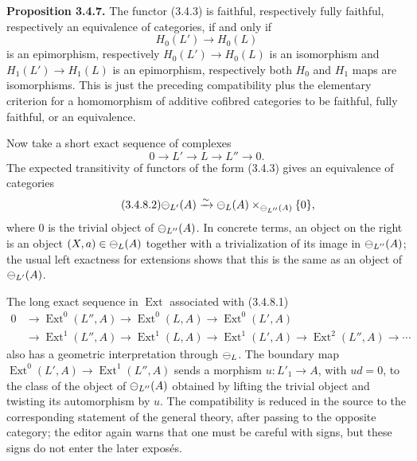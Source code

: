 \documentclass[11pt]{article}
\providecommand{\Ext}{\operatorname{Ext}}
\begin{document}
\textbf{Proposition 3.4.7.}  The functor (3.4.3) is faithful, respectively fully faithful, respectively an equivalence of categories, if and only if
\begin{equation}\tag{3.4.7.1}
  H_0(L')\longrightarrow H_0(L)
\end{equation}
is an epimorphism, respectively \(H_0(L')\to H_0(L)\) is an isomorphism and \(H_1(L')\to H_1(L)\) is an epimorphism, respectively both \(H_0\) and \(H_1\) maps are isomorphisms.  This is just the preceding compatibility plus the elementary criterion for a homomorphism of additive cofibred categories to be faithful, fully faithful, or an equivalence.

Now take a short exact sequence of complexes
\begin{equation}\tag{3.4.8.1}
  0\longrightarrow L'\longrightarrow L\longrightarrow L''\longrightarrow0.
\end{equation}
The expected transitivity of functors of the form (3.4.3) gives an equivalence of categories
\begin{equation}\tag{3.4.8.2}
  \mathcal\Psi_{L'}(A)\xrightarrow{\sim}\mathcal\Psi_L(A)\times_{\mathcal\Psi_{L''}(A)}\{0\},
\end{equation}
where \(0\) is the trivial object of \(\mathcal\Psi_{L''}(A)\).  In concrete terms, an object on the right is an object \((X,a)\in\mathcal\Psi_L(A)\) together with a trivialization of its image in \(\mathcal\Psi_{L''}(A)\); the usual left exactness for extensions shows that this is the same as an object of \(\mathcal\Psi_{L'}(A)\).

The long exact sequence in \(\Ext\) associated with (3.4.8.1)
\begin{equation}\tag{3.4.9.1}
\begin{aligned}
0&\to\Ext^0(L'',A)\to\Ext^0(L,A)\to\Ext^0(L',A)\\
 &\to\Ext^1(L'',A)\to\Ext^1(L,A)\to\Ext^1(L',A)\to\Ext^2(L'',A)\to\cdots
\end{aligned}
\end{equation}
also has a geometric interpretation through \(\mathcal\Psi_L\).  The boundary map \(\Ext^0(L',A)\to\Ext^1(L'',A)\) sends a morphism \(u:L'_1\to A\), with \(u d=0\), to the class of the object of \(\mathcal\Psi_{L''}(A)\) obtained by lifting the trivial object and twisting its automorphism by \(u\).  The compatibility is reduced in the source to the corresponding statement of the general theory, after passing to the opposite category; the editor again warns that one must be careful with signs, but these signs do not enter the later expos\'es.
\end{document}

